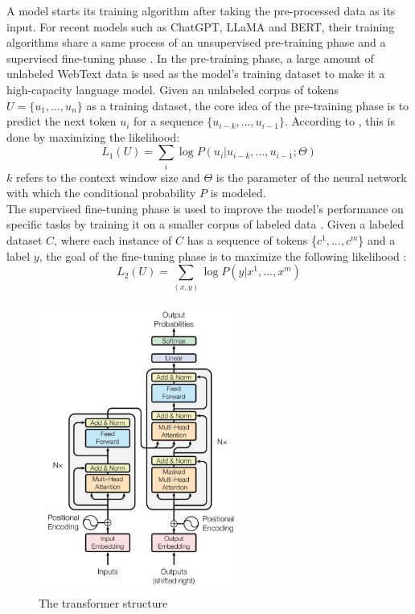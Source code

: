 \documentclass[runningheads]{llncs}
\begin{document}
\noindent \newline
A model starts its training algorithm after taking the pre-processed data as its input. For recent models such as ChatGPT, LLaMA and BERT, their training algorithms share a same process of an unsupervised pre-training phase and a supervised fine-tuning phase \cite{Roum23}.
In the pre-training phase, a large amount of unlabeled WebText data is used as the model's training dataset to make it a high-capacity language model. Given an unlabeled corpus of tokens $U=\{u_1,...,u_n\}$ as a training dataset, the core idea of the pre-training phase is to 
predict the next token $u_i$ for a sequence $\{u_{i-k},...,u_{i-1}\}$. According to \cite{Radford18}, this is done by maximizing the likelihood: 
\begin{equation}
  L_1(U) = \sum_{i}\log{P(u_i|u_{i-k},...,u_{i-1}; \Theta)}
\end{equation}
$k$ refers to the context window size and $\Theta$ is the parameter of the neural network with which the conditional probability $P$ is modeled. \\
\noindent \newline
The supervised fine-tuning phase is used to improve the model's performance on specific tasks by training it on a smaller corpus of labeled data \cite{Roum23}. Given a labeled dataset $C$,
where each instance of $C$ has a sequence of tokens \{$c^1,...,c^m$\} and a label $y$, the goal of the fine-tuning phase is to maximize the following likelihood \cite{Radford18}:
\begin{equation}
  L_2(U) = \sum_{(x,y)}\log{P(y|x^1,...,x^m)}
\end{equation}

  \begin{figure}[htbp]
      \centering
      \includegraphics[width=0.6\textwidth]{attention1.jpg}
      \caption{The transformer structure \cite{Vaswani17}}
      \label{fig:attention}
  \end{figure}
\end{document}
